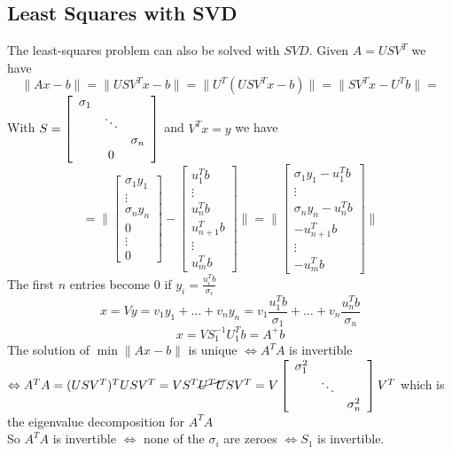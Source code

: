 \documentclass[10pt]{report}
\begin{document}
\subsection{Least Squares with SVD}
The least-squares problem can also be solved with $SVD$. Given $A=USV^T$ we have $$\|Ax-b\| = \|USV^Tx-b\| = \|U^T(USV^Tx - b)\| = \|SV^Tx-U^Tb\| =$$
With $S =\left[\begin{array}{c c c}
\sigma_1\\
& \ddots\\
& & \sigma_n\\
& 0
\end{array}\right]$ and $V^Tx = y$ we have
$$=\|\left[\begin{array}{c}
\sigma_1y_1\\\vdots\\\sigma_ny_n\\0\\\vdots\\0
\end{array}\right] - \left[\begin{array}{c}
u_1^Tb\\\vdots\\u_n^Tb\\u_{n+1}^Tb\\\vdots\\u_m^Tb
\end{array}\right] \| = \|\left[\begin{array}{c}
\sigma_1y_1-u_1^Tb\\\vdots\\\sigma_ny_n-u_n^Tb\\-u_{n+1}^Tb\\\vdots\\-u_m^Tb
\end{array}\right]\|$$
The first $n$ entries become $0$ if $y_i = \frac{u_i^Tb}{\sigma_i}$\\
$$x = Vy = v_1y_1 + \ldots + v_ny_n = v_1\frac{u_1^Tb}{\sigma_1} + \ldots + v_n\frac{u_n^Tb}{\sigma_n}$$
$$x = VS_1^{-1}U_1^Tb = A^+b$$
The solution of $\min \|Ax-b\|$ is unique $\Leftrightarrow A^TA$ is invertible $\Leftrightarrow A^TA=(USV^T)^TUSV^T = VS^T\cancel{U^TU}SV^T = V\left[\begin{array}{c c c}
\sigma_1^2\\
& \ddots\\
& & \sigma_n^2
\end{array}\right]V^T$ which is the eigenvalue decomposition for $A^TA$\\
So $A^TA$ is invertible $\Leftrightarrow$ none of the $\sigma_i$ are zeroes $\Leftrightarrow S_1$ is invertible.\\
\end{document}
